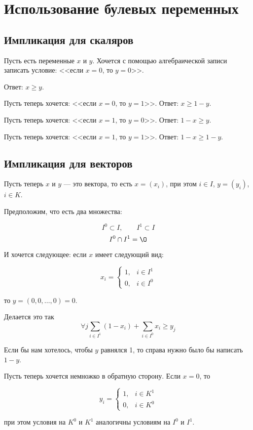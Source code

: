 \chapter{Использование булевых переменных}

\section{Импликация для скаляров}

Пусть есть переменные $x$ и $y$. Хочется с помощью алгебраической записи записать условие: <<если $x = 0$, то $y = 0$>>.

Ответ: $x \ge y$.


Пусть теперь хочется: <<если $x = 0$, то $y = 1$>>. Ответ: $x \ge 1 - y$.

Пусть теперь хочется: <<если $x = 1$, то $y = 0$>>. Ответ: $1 - x \ge y$.

Пусть теперь хочется: <<если $x = 1$, то $y = 1$>>. Ответ: $1 - x \ge 1 - y$.


\section{Импликация для векторов}

Пусть теперь $x$ и $y$ --- это вектора, то есть $x = (x_i)$, при этом $i \in I$, $y = (y_i)$, $i \in K$.

Предположим, что есть два множества: 

\[I^0 \subset I, \qquad I^1 \subset I\]
\[I^0 \cap I^1 = \O\]


И хочется следующее: если $x$ имеет следующий вид:

\[x_i = \begin{cases}
	1,& i \in I^1\\
	0,& i \in I^0
\end{cases}\]

то $y = (0, 0, \dots, 0) = 0$.

Делается это так
\[\forall j \sum_{i \in I^1}(1-x_i) + \sum_{i \in I^0}x_i \ge y_j\]

Если бы нам хотелось, чтобы $y$ равнялся 1, то справа нужно было бы написать $1-y$.

Пусть теперь хочется немножко в обратную сторону. Если $x = 0$, то

\[y_i = \begin{cases}
	1,& i \in K^1\\
	0,& i \in K^0
\end{cases}\]

при этом условия на $K^0$ и $K^1$ аналогичны условиям на $I^0$ и $I^1$.

